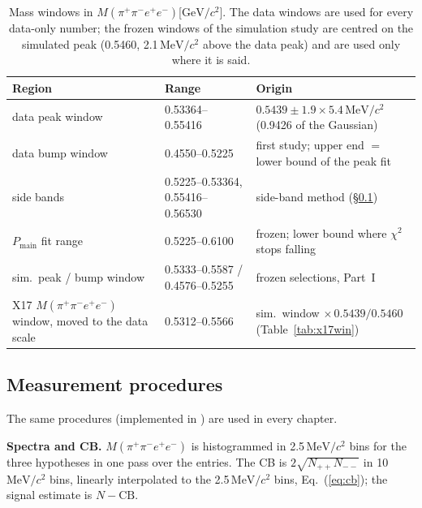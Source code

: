 \documentclass[11pt,a4paper]{article}
\newcommand{\Mfour}{\ensuremath{M(\pi^{+}\pi^{-}e^{+}e^{-})}\xspace}
\newcommand{\GeVcc}{\ensuremath{\mathrm{GeV}/c^{2}}\xspace}
\newcommand{\MeVcc}{\ensuremath{\mathrm{MeV}/c^{2}}\xspace}
\newcommand{\code}[1]{\texttt{\detokenize{#1}}}
\newcommand{\Pmain}{\ensuremath{P_{\mathrm{main}}}\xspace}
\begin{document}
\begin{table}[H]
\centering
\caption{Mass windows in \Mfour [\GeVcc]. The data windows are used for every data-only number; the frozen
windows of the simulation study are centred on the simulated peak (0.5460, 2.1\,\MeVcc above the data peak) and
are used only where it is said.}
\label{tab:windows}
\small
\begin{tabularx}{\textwidth}{@{}l l L@{}}
\toprule
Region & Range & Origin \\
\midrule
data peak window & 0.53364--0.55416 & $0.5439\pm1.9\times5.4$\,\MeVcc (0.9426 of the Gaussian) \\
data bump window & 0.4550--0.5225 & first study; upper end $=$ lower bound of the peak fit \\
side bands & 0.5225--0.53364, 0.55416--0.56530 & side-band method (\S\ref{sec:proc}) \\
\Pmain fit range & 0.5225--0.6100 & frozen; lower bound where $\chi^2$ stops falling \\
sim.\ peak / bump window & 0.5333--0.5587 / 0.4576--0.5255 & frozen selections, Part~I \\
X17 \Mfour window, moved to the data scale & 0.5312--0.5566 & sim.\ window $\times\,0.5439/0.5460$ (Table~\ref{tab:x17win}) \\
\bottomrule
\end{tabularx}
\end{table}

\subsection{Measurement procedures}
\label{sec:proc}
The same procedures (implemented in \code{plots/ScanEngine.h}) are used in every chapter.

\textbf{Spectra and CB.} \Mfour is histogrammed in 2.5\,\MeVcc bins for the three hypotheses in one pass over
the entries. The CB is $2\sqrt{N_{++}N_{--}}$ in 10\,\MeVcc bins, linearly interpolated to the 2.5\,\MeVcc bins,
Eq.~(\ref{eq:cb}); the signal estimate is $N-\mathrm{CB}$.
\end{document}
